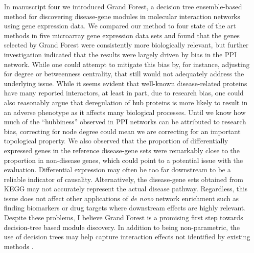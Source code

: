In manuscript four we introduced Grand Forest, a decision tree ensemble-based method for discovering disease-gene modules in molecular interaction networks using gene expression data. We compared our method to four state of the art methods in five microarray gene expression data sets and found that the genes selected by Grand Forest were consistently more biologically relevant, but further investigation indicated that the results were largely driven by bias in the PPI network. While one could attempt to mitigate this bias by, for instance, adjusting for degree or betweenness centrality, that still would not adequately address the underlying issue. While it seems evident that well-known disease-related proteins have many reported interactors, at least in part, due to research bias, one could also reasonably argue that deregulation of hub proteins is more likely to result in an adverse phenotype as it affects many biological processes. Until we know how much of the \enquote{hubbiness} observed in PPI networks can be attributed to research bias, correcting for node degree could mean we are correcting for an important topological property.
We also observed that the proportion of differentially expressed genes in the reference disease-gene sets were remarkably close to the proportion in non-disease genes, which could point to a potential issue with the evaluation. Differential expression may often be too far downstream to be a reliable indicator of causality. Alternatively, the disease-gene sets obtained from KEGG may not accurately represent the actual disease pathway. Regardless, this issue does not affect other applications of \emph{de novo} network enrichment such as finding biomarkers or drug targets where downstream effects are highly relevant.
Despite these problems, I believe Grand Forest is a promising first step towards decision-tree based module discovery. In addition to being non-parametric, the use of decision trees may help capture interaction effects not identified by existing methods \cite{Lunetta2004,McKinney2006,Wright2016}.

